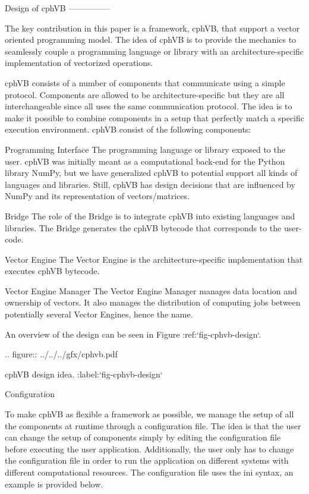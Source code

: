 
Design of cphVB
---------------

The key contribution in this paper is a framework, cphVB, that support a vector oriented programming model. The idea of cphVB is to provide the mechanics to seamlessly couple a programming language or library with an architecture-specific implementation of vectorized operations.

cphVB consists of a number of components that communicate using a simple protocol. Components are allowed to be architecture-specific but they are all interchangeable since all uses the same communication protocol. The idea is to make it possible to combine components in a setup that perfectly match a specific execution environment. cphVB consist of the following components:

Programming Interface
  The programming language or library exposed to the user. cphVB was initially meant as a computational back-end for the Python library NumPy, but we have generalized cphVB to potential support all kinds of languages and libraries. Still, cphVB has design decisions that are influenced by NumPy and its representation of vectors/matrices.

Bridge
  The role of the Bridge is to integrate cphVB into existing languages and libraries. The Bridge generates the cphVB bytecode that corresponds to the user-code.

Vector Engine
  The Vector Engine is the architecture-specific implementation that executes cphVB bytecode. 

Vector Engine Manager
  The Vector Engine Manager manages data location and ownership of vectors. It also manages the distribution of computing jobs between potentially several Vector Engines, hence the name.

An overview of the design can be seen in Figure :ref:`fig-cphvb-design`.

.. figure:: ../../../gfx/cphvb.pdf

   cphVB design idea. :label:`fig-cphvb-design`

Configuration
~~~~~~~~~~~~~

To make cphVB as flexible a framework as possible, we manage the setup of all the components at runtime through a configuration file. The idea is that the user can change the setup of components simply by editing the configuration file before executing the user application. Additionally, the user only has to change the configuration file in order to run the application on different systems with different computational resources. The configuration file uses the ini syntax, an example is provided below.



